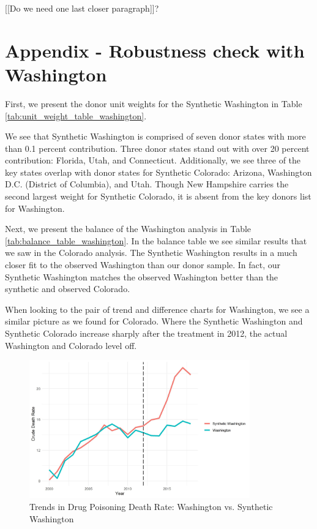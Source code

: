 \documentclass{article}
\begin{document}
[[Do we need one last closer paragraph]]?

\newpage

\section{Appendix - Robustness check with Washington}

First, we present the donor unit weights for the Synthetic Washington in Table \ref{tab:unit_weight_table_washington}.



We see that Synthetic Washington is comprised of seven donor states with more than 0.1 percent contribution. Three donor states stand out with over 20 percent contribution: Florida, Utah, and Connecticut. Additionally, we see three of the key states overlap with donor states for Synthetic Colorado: Arizona, Washington D.C. (District of Columbia), and Utah. Though New Hampshire carries the second largest weight for Synthetic Colorado, it is absent from the key donors list for Washington.

Next, we present the balance of the Washington analysis in Table \ref{tab:balance_table_washington}. In the balance table we see similar results that we saw in the Colorado analysis. The Synthetic Washington results in a much closer fit to the observed Washington than our donor sample. In fact, our Synthetic Washington matches the observed Washington better than the synthetic and observed Colorado. 



When looking to the pair of trend and difference charts for Washington, we see a similar picture as we found for Colorado. Where the Synthetic Washington and Synthetic Colorado increase sharply after the treatment in 2012, the actual Washington and Colorado level off.

\begin{figure}[H]
	\begin{center}
		\includegraphics[width=0.85\textwidth]{trends_plot_washington}
	\end{center}
	\caption{Trends in Drug Poisoning Death Rate: Washington vs. Synthetic Washington}
	\label{fig:trends_plot_washington}
\end{figure}
\end{document}
